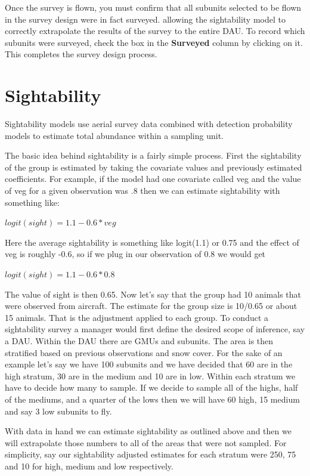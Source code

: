 \documentclass[
]{book}
\begin{document}
Once the survey is flown, you must confirm that all subunits selected to be flown in the survey design were in fact surveyed. allowing the sightability model to correctly extrapolate the results of the survey to the entire DAU. To record which subunits were surveyed, check the box in the \textbf{Surveyed} column by clicking on it. This completes the survey design process.

\hypertarget{sight}{%
\chapter{Sightability}\label{sight}}

Sightability models use aerial survey data combined with detection probability models to estimate total abundance within a sampling unit.

The basic idea behind sightability is a fairly simple process. First the sightability of the group is estimated by taking the covariate values and previously estimated coefficients. For example, if the model had one covariate called veg and the value of veg for a given observation was .8 then we can estimate sightability with something like:

\(logit(sight) = 1.1 - 0.6 * veg\)

Here the average sightability is something like logit(1.1) or 0.75 and the effect of veg is roughly -0.6, so if we plug in our observation of 0.8 we would get

\(logit(sight) = 1.1 - 0.6 * 0.8\)

The value of sight is then 0.65. Now let's say that the group had 10 animals that were observed from aircraft. The estimate for the group size is 10/0.65 or about 15 animals. That is the adjustment applied to each group.
To conduct a sightability survey a manager would first define the desired scope of inference, say a DAU. Within the DAU there are GMUs and subunits. The area is then stratified based on previous observations and snow cover. For the sake of an example let's say we have 100 subunits and we have decided that 60 are in the high stratum, 30 are in the medium and 10 are in low. Within each stratum we have to decide how many to sample. If we decide to sample all of the highs, half of the mediums, and a quarter of the lows then we will have 60 high, 15 medium and say 3 low subunits to fly.

With data in hand we can estimate sightability as outlined above and then we will extrapolate those numbers to all of the areas that were not sampled. For simplicity, say our sightability adjusted estimates for each stratum were 250, 75 and 10 for high, medium and low respectively.
\end{document}
